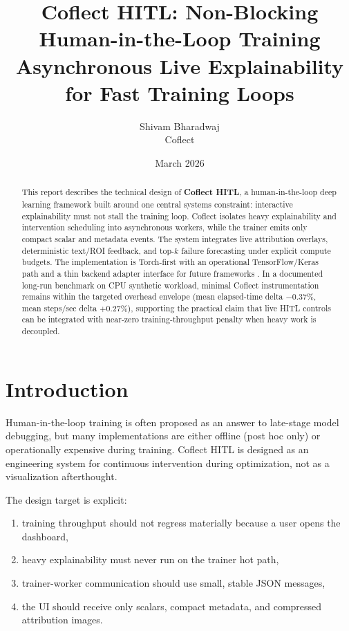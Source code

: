 \documentclass[11pt]{article}
\title{Coflect HITL: Non-Blocking Human-in-the-Loop Training\\\large Asynchronous Live Explainability for Fast Training Loops}
\author{Shivam Bharadwaj\\Coflect}
\date{March 2026}
\begin{document}
\maketitle

\begin{abstract}
This report describes the technical design of \textbf{Coflect HITL}, a human-in-the-loop deep learning framework built around one central systems constraint: interactive explainability must not stall the training loop.
Coflect isolates heavy explainability and intervention scheduling into asynchronous workers, while the trainer emits only compact scalar and metadata events.
The system integrates live attribution overlays, deterministic text/ROI feedback, and top-$k$ failure forecasting under explicit compute budgets.
The implementation is Torch-first with an operational TensorFlow/Keras path and a thin backend adapter interface for future frameworks \cite{paszke2019pytorch,abadi2016tensorflow,jax2018github}.
In a documented long-run benchmark on CPU synthetic workload, minimal Coflect instrumentation remains within the targeted overhead envelope (mean elapsed-time delta $-0.37\%$, mean steps/sec delta $+0.27\%$), supporting the practical claim that live HITL controls can be integrated with near-zero training-throughput penalty when heavy work is decoupled.
\end{abstract}

\section{Introduction}
Human-in-the-loop training is often proposed as an answer to late-stage model debugging, but many implementations are either offline (post hoc only) or operationally expensive during training.
Coflect HITL is designed as an engineering system for continuous intervention during optimization, not as a visualization afterthought.

The design target is explicit:
\begin{enumerate}[leftmargin=1.5em]
  \item training throughput should not regress materially because a user opens the dashboard,
  \item heavy explainability must never run on the trainer hot path,
  \item trainer-worker communication should use small, stable JSON messages,
  \item the UI should receive only scalars, compact metadata, and compressed attribution images.
\end{enumerate}
\end{document}
